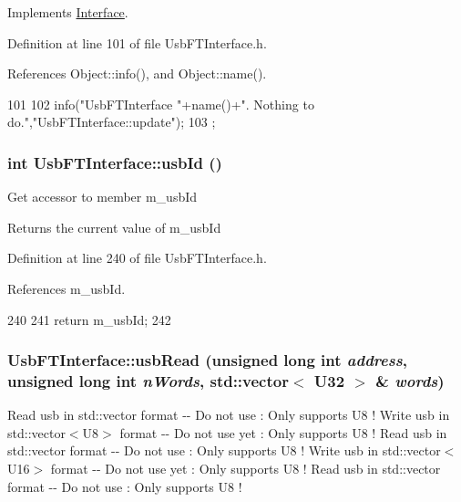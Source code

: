 Implements \hyperlink{classInterface_a30e71ffbe36091df9f7c0838dd4b60d2}{Interface}.

Definition at line 101 of file UsbFTInterface.h.

References Object::info(), and Object::name().


\begin{DoxyCode}
101                          {
102     info("UsbFTInterface "+name()+". Nothing to do.","UsbFTInterface::update");
103   };
\end{DoxyCode}
\hypertarget{classUsbFTInterface_a2a63b462eb5831b4aef9d0f4c8d6ee1a}{
\subsubsection[{usbId}]{\setlength{\rightskip}{0pt plus 5cm}int UsbFTInterface::usbId ()}}
\label{classUsbFTInterface_a2a63b462eb5831b4aef9d0f4c8d6ee1a}
Get accessor to member m\_\-usbId \begin{DoxyReturn}{Returns}
the current value of m\_\-usbId 
\end{DoxyReturn}


Definition at line 240 of file UsbFTInterface.h.

References m\_\-usbId.


\begin{DoxyCode}
240                {
241     return m_usbId;
242   }
\end{DoxyCode}
\hypertarget{classUsbFTInterface_adb38dfafa3946dd373585e596851b6e6}{
\subsubsection[{usbRead}]{ UsbFTInterface::usbRead (unsigned long int {\em address}, \/  unsigned long int {\em nWords}, \/  std::vector$<$ {\bf U32} $>$ \& {\em words})}}
\label{classUsbFTInterface_adb38dfafa3946dd373585e596851b6e6}
Read usb in std::vector format -\/-\/ Do not use : Only supports U8 ! Write usb in std::vector$<$U8$>$ format -\/-\/ Do not use yet : Only supports U8 ! Read usb in std::vector format -\/-\/ Do not use : Only supports U8 ! Write usb in std::vector$<$U16$>$ format -\/-\/ Do not use yet : Only supports U8 ! Read usb in std::vector format -\/-\/ Do not use : Only supports U8 ! 

